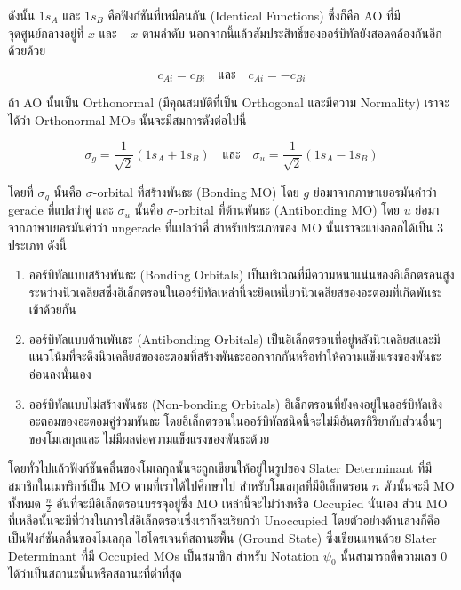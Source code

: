 \noindent ดังนั้น $1 s_A$ และ $1 s_B$ คือฟังก์ชันที่เหมือนกัน (Identical Functions) ซึ่งก็คือ AO ที่มีจุดศูนย์กลางอยู่ที่ $x$ และ
$-x$ ตามลำดับ นอกจากนี้แล้วสัมประสิทธิ์ของออร์บิทัลยังสอดคล้องกันอีกด้วยด้วย

\begin{equation}
  c_{A i} = c_{B i}
  \quad \text{และ} \quad
  c_{A i} = -c_{B i}
\end{equation}

ถ้า AO นั้นเป็น Orthonormal (มีคุณสมบัติที่เป็น Orthogonal และมีความ Normality) เราจะได้ว่า Orthonormal MOs นั้นจะมีสมการดังต่อไปนี้

\begin{equation}
  \sigma_g
  =
  \frac{1}{\sqrt{2}}\left(1 s_A+1 s_B\right)
  \quad \text{และ} \quad
  \sigma_u
  =
  \frac{1}{\sqrt{2}}\left(1 s_A-1 s_B\right)
\end{equation}

\noindent โดยที่ $\sigma_g$ นั้นคือ $\sigma$-orbital ที่สร้างพันธะ (Bonding MO) โดย $g$ ย่อมาจากภาษาเยอรมันคำว่า gerade
ที่แปลว่าคู่ และ $\sigma_u$ นั้นคือ $\sigma$-orbital ที่ต้านพันธะ (Antibonding MO) โดย $u$ ย่อมาจากภาษาเยอรมันคำว่า ungerade
ที่แปลว่าคี่ สำหรับประเภทของ MO นั้นเราจะแบ่งออกได้เป็น 3 ประเภท ดังนี้

\begin{enumerate}[topsep=0pt,noitemsep]
  \setlength\itemsep{1em}
  \item ออร์บิทัลแบบสร้างพันธะ (Bonding Orbitals)
        เป็นบริเวณที่มีความหนาแน่นของอิเล็กตรอนสูงระหว่างนิวเคลียสซึ่งอิเล็กตรอนในออร์บิทัลเหล่านี้จะยึดเหนี่ยวนิวเคลียสของอะตอมที่เกิดพันธะเข้าด้วยกัน

  \item ออร์บิทัลแบบต้านพันธะ (Antibonding Orbitals)
        เป็นอิเล็กตรอนที่อยู่หลังนิวเคลียสและมีแนวโน้มที่จะดึงนิวเคลียสของอะตอมที่สร้างพันธะออกจากกันหรือทำให้ความแข็งแรงของพันธะอ่อนลงนั่นเอง

  \item ออร์บิทัลแบบไม่สร้างพันธะ (Non-bonding Orbitals)
        อิเล็กตรอนที่ยังคงอยู่ในออร์บิทัลเชิงอะตอมของอะตอมคู่ร่วมพันธะ โดยอิเล็กตรอนในออร์บิทัลชนิดนี้จะไม่มีอันตรกิริยากับส่วนอื่นๆของโมเลกุลและ%
        ไม่มีผลต่อความแข็งแรงของพันธะด้วย
\end{enumerate}

โดยทั่วไปแล้วฟังก์ชันคลื่นของโมเลกุลนั้นจะถูกเขียนให้อยู่ในรูปของ Slater Determinant ที่มีสมาชิกในเมทริกซ์เป็น MO ตามที่เราได้ไปศึกษาไป
สำหรับโมเลกุลที่มีอิเล็กตรอน $n$ ตัวนั้นจะมี MO ทั้งหมด $\frac{n}{2}$ อันที่จะมีอิเล็กตรอนบรรจุอยู่ซึ่ง MO เหล่านี้จะไม่ว่างหรือ Occupied
นั่นเอง ส่วน MO ที่เหลือนั้นจะมีที่ว่างในการใส่อิเล็กตรอนซึ่งเราก็จะเรียกว่า Unoccupied โดยตัวอย่างด้านล่างก็คือเป็นฟังก์ชันคลื่นของโมเลกุล%
ไฮโดรเจนที่สถานะพื้น (Ground State) ซึ่งเขียนแทนด้วย Slater Determinant ที่มี Occupied MOs เป็นสมาชิก สำหรับ Notation
$\psi_0$ นั้นสามารถตีความเลข 0 ได้ว่าเป็นสถานะพื้นหรือสถานะที่ต่ำที่สุด

